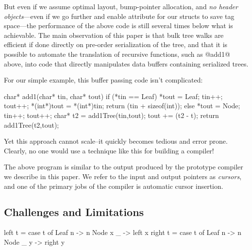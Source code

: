 \documentclass[preprint,10pt,nocopyrightspace,nonatbib]{./bibs/sigplanconf}
\newif\ifcurly
\begin{document}
But even if we assume optimal layout, bump-pointer allocation, and {\em no
  header objects}---even if we go further and enable  attribute
for our structs to save tag space---the performance of the above code is still
several times below what is achievable.  The main observation of this paper is
that bulk tree walks are efficient if done directly on pre-order serialization
of the tree, and that it is possible to automate the translation of recursive
functions, such as @add1@ above, into code that directly manipulates data
buffers containing serialized trees.

For our simple example, this buffer passing code isn't complicated:
%
\begin{code}[language=c]
char* add1(char* tin, char* tout) {
  if (*tin == Leaf) {
    *tout = Leaf;
    tin++; tout++;
    *(int*)tout = *(int*)tin;
    return (tin + sizeof(int));
  } else {
    *tout = Node;
    tin++; tout++;
    char* t2 = add1Tree(tin,tout);
    tout += (t2 - t);
    return add1Tree(t2,tout);
  }
}
\end{code}
%
Yet this approach cannot scale--it quickly becomes tedious and error prone.
Clearly, no one would use a technique like this for building a compiler!

The above program is similar to the output produced by the prototype compiler we
describe in this paper.  We refer to the input and output pointers as {\em
  cursors}, and one of the primary jobs of the compiler is automatic cursor
insertion.


\subsection{Challenges and Limitations}



\ifcurly
\begin{code}[language=c]
fun left(t) {
  match(t) {
    Leaf(n):   return n;
    Node(x,_): return left(x);
  }}
fun right(t) {
  match(t) {
    Leaf(n):   return n;
    Node(_,y): return right(y);
  }}
\end{code}
\else
\begin{code}
 left t = case t of
            Leaf n   -> n
            Node x _ -> left x
 right t = case t of
             Leaf n   -> n
             Node _ y -> right y
\end{code}
\fi
\end{document}

